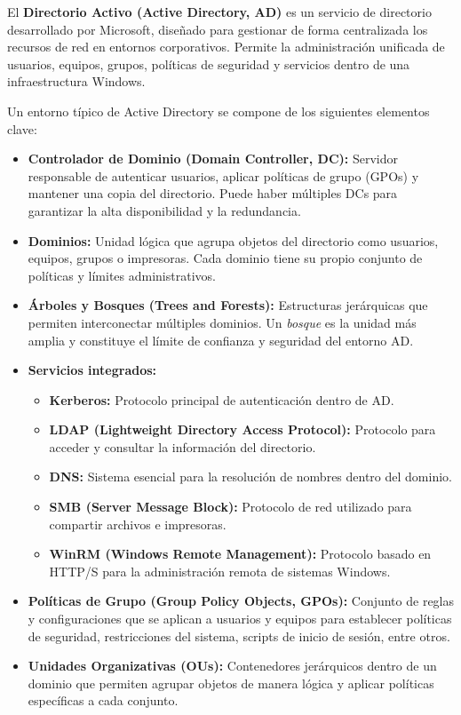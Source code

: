 \documentclass[a4paper, 11pt]{article}
\begin{document}
El \textbf{Directorio Activo (Active Directory, AD)} es un servicio de directorio desarrollado por Microsoft, diseñado para gestionar de forma centralizada los recursos de red en entornos corporativos. Permite la administración unificada de usuarios, equipos, grupos, políticas de seguridad y servicios dentro de una infraestructura Windows.

Un entorno típico de Active Directory se compone de los siguientes elementos clave:

\begin{itemize}
    \item \textbf{Controlador de Dominio (Domain Controller, DC):} Servidor responsable de autenticar usuarios, aplicar políticas de grupo (GPOs) y mantener una copia del directorio. Puede haber múltiples DCs para garantizar la alta disponibilidad y la redundancia.
    
    \item \textbf{Dominios:} Unidad lógica que agrupa objetos del directorio como usuarios, equipos, grupos o impresoras. Cada dominio tiene su propio conjunto de políticas y límites administrativos.

    \item \textbf{Árboles y Bosques (Trees and Forests):} Estructuras jerárquicas que permiten interconectar múltiples dominios. Un \textit{bosque} es la unidad más amplia y constituye el límite de confianza y seguridad del entorno AD.
    
    \item \textbf{Servicios integrados:}
    \begin{itemize}
        \item \textbf{Kerberos:} Protocolo principal de autenticación dentro de AD.
        \item \textbf{LDAP (Lightweight Directory Access Protocol):} Protocolo para acceder y consultar la información del directorio.
        \item \textbf{DNS:} Sistema esencial para la resolución de nombres dentro del dominio.
        \item \textbf{SMB (Server Message Block):} Protocolo de red utilizado para compartir archivos e impresoras.
        \item \textbf{WinRM (Windows Remote Management):} Protocolo basado en HTTP/S para la administración remota de sistemas Windows.
    \end{itemize}
    
    \item \textbf{Políticas de Grupo (Group Policy Objects, GPOs):} Conjunto de reglas y configuraciones que se aplican a usuarios y equipos para establecer políticas de seguridad, restricciones del sistema, scripts de inicio de sesión, entre otros.

    \item \textbf{Unidades Organizativas (OUs):} Contenedores jerárquicos dentro de un dominio que permiten agrupar objetos de manera lógica y aplicar políticas específicas a cada conjunto.
\end{itemize}
\end{document}
